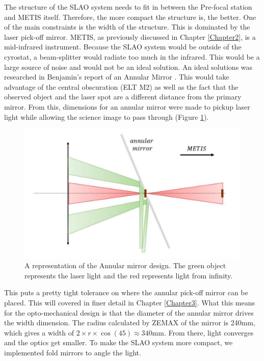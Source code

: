 The structure of the SLAO system needs to fit in between the Pre-focal station and
METIS itself.  Therefore, the more compact the structure is, the better.  One of the
main constraints is the width of the structure.  This is dominated by the laser
pick-off mirror.  METIS, as previously discussed in Chapter \ref{Chapter2}, is a
mid-infrared instrument.  Because the SLAO system would be outside of the cyrostat,
a beam-splitter would radiate too much in the infrared.  This would be a large
source of noise and would not be an ideal solution.  An ideal solutions was
researched in Benjamin's report of an Annular Mirror \cite{arcier}.  This would take
advantage of the central obscuration (ELT M2) as well as the fact that the observed
object and the laser spot are a different distance from the primary mirror.  From
this, dimensions for an annular mirror were made to pickup laser light while
allowing the science image to pass through (Figure \ref{fig:ann_mirror}).


\begin{figure}[h!]
\centering
\includegraphics[width=12 cm]{Figures/ann_mirror.png}
\caption{A representation of the Annular mirror design.  The green object represents the laser light and the red represents light from infinity. \cite{arcier}}
\label{fig:ann_mirror}
\end{figure}

This puts a pretty tight tolerance on where the annular pick-off mirror can be
placed.  This will covered in finer detail in Chapter \ref{Chapter3}.  What this
means for the opto-mechanical design is that the diameter of the annular mirror
drives the width dimension.  The radius calculated by ZEMAX of the mirror is 240mm,
which gives a width of $2 \times r \times \cos(45) \approx 340$mm.  From there,
light converges and the optics get smaller.  To make the SLAO system more compact,
we implemented fold mirrors to angle the light.

